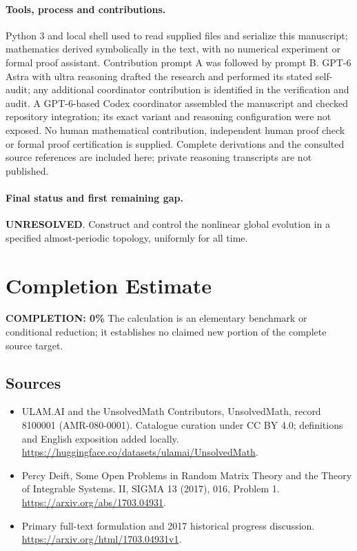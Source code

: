 \documentclass[11pt]{article}
\begin{document}
\paragraph{Tools, process and contributions.}
Python 3 and local shell used to read supplied files and serialize this manuscript; mathematics derived symbolically in the text, with no numerical experiment or formal proof assistant. Contribution prompt A was followed by prompt B. GPT-6 Astra with ultra reasoning drafted the research and performed its stated self-audit; any additional coordinator contribution is identified in the verification and audit. A GPT-6-based Codex coordinator assembled the manuscript and checked repository integration; its exact variant and reasoning configuration were not exposed. No human mathematical contribution, independent human proof check or formal proof certification is supplied. Complete derivations and the consulted source references are included here; private reasoning transcripts are not published.

\paragraph{Final status and first remaining gap.}
\textbf{UNRESOLVED}. Construct and control the nonlinear global evolution in a specified almost-periodic topology, uniformly for all time.

\section{Completion Estimate}
\noindent\textbf{COMPLETION: 0\%}
The calculation is an elementary benchmark or conditional reduction; it establishes no claimed new portion of the complete source target.

\subsection{Sources}
\begin{itemize}
\item[\hypertarget{source:8100001:1}{S1}] ULAM.AI and the UnsolvedMath Contributors, UnsolvedMath, record 8100001 (AMR-080-0001). Catalogue curation under CC BY 4.0; definitions and English exposition added locally.
\url{https://huggingface.co/datasets/ulamai/UnsolvedMath}.
\item[\hypertarget{source:8100001:2}{S2}] Percy Deift, Some Open Problems in Random Matrix Theory and the Theory of Integrable Systems. II, SIGMA 13 (2017), 016, Problem 1.
\url{https://arxiv.org/abs/1703.04931}.
\item[\hypertarget{source:8100001:3}{S3}] Primary full-text formulation and 2017 historical progress discussion.
\url{https://arxiv.org/html/1703.04931v1}.
\end{itemize}
\label{end:8100001}
\end{document}
